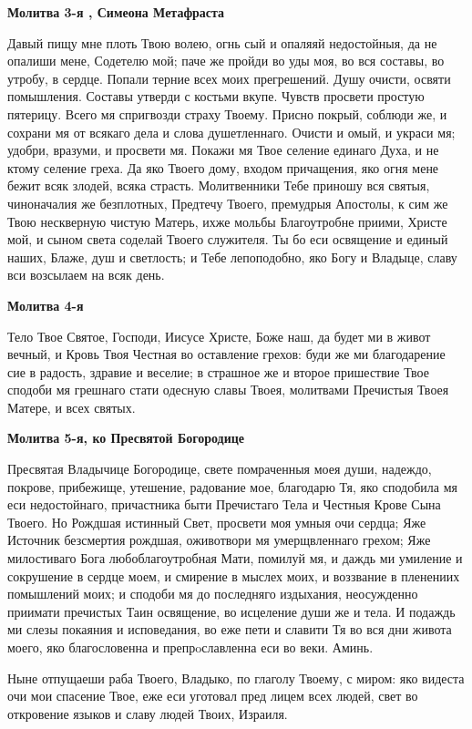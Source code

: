 \medskip
\bfseries Молитва 3-я , Симеона Метафраста\normalfont{}


Давый пищу мне плоть Твою волею, огнь сый и опаляяй недостойныя, да не опалиши мене, Содетелю мой; паче же пройди во уды моя, во вся составы, во утробу, в сердце. Попали терние всех моих прегрешений. Душу очисти, освяти помышления. Составы утверди с костьми вкупе. Чувств просвети простую пятерицу. Всего мя спригвозди страху Твоему. Присно покрый, соблюди же, и сохрани мя от всякаго дела и слова душетленнаго. Очисти и омый, и украси мя; удобри, вразуми, и просвети мя. Покажи мя Твое селение единаго Духа, и не ктому селение греха. Да яко Твоего дому, входом причащения, яко огня мене бежит всяк злодей, всяка страсть. Молитвенники Тебе приношу вся святыя, чиноначалия же безплотных, Предтечу Твоего, премудрыя Апостолы, к сим же Твою нескверную чистую Матерь, ихже мольбы Благоутробне приими, Христе мой, и сыном света соделай Твоего служителя. Ты бо еси освящение и единый наших, Блаже, душ и светлость; и Тебе лепоподобно, яко Богу и Владыце, славу вси возсылаем на всяк день.


\medskip
\bfseries Молитва 4-я\normalfont{}


Тело Твое Святое, Господи, Иисусе Христе, Боже наш, да будет ми в живот вечный, и Кровь Твоя Честная во оставление грехов: буди же ми благодарение сие в радость, здравие и веселие; в страшное же и второе пришествие Твое сподоби мя грешнаго стати одесную славы Твоея, молитвами Пречистыя Твоея Матере, и всех святых.


\medskip
\bfseries Молитва 5-я, ко Пресвятой Богородице\normalfont{}


Пресвятая Владычице Богородице, свете помраченныя моея души, надеждо, покрове, прибежище, утешение, радование мое, благодарю Тя, яко сподобила мя еси недостойнаго, причастника быти Пречистаго Тела и Честныя Крове Сына Твоего. Но Рождшая истинный Свет, просвети моя умныя очи сердца; Яже Источник безсмертия рождшая, оживотвори мя умерщвленнаго грехом; Яже милостиваго Бога любоблагоутробная Мати, помилуй мя, и даждь ми умиление и сокрушение в сердце моем, и смирение в мыслех моих, и воззвание в пленениих помышлений моих; и сподоби мя до последняго издыхания, неосужденно приимати пречистых Таин освящение, во исцеление души же и тела. И подаждь ми слезы покаяния и исповедания, во еже пети и славити Тя во вся дни живота моего, яко благословенна и препрoславленна еси во веки. Аминь.


Ныне отпущаеши раба Твоего, Владыко, по глаголу Твоему, с миром: яко видеста очи мои спасение Твое, еже еси уготовал пред лицем всех людей, свет во откровение языков и славу людей Твоих, Израиля.


